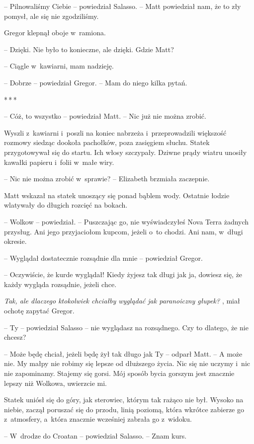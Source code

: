 \documentclass[oneside,polish,12pt,sfheadings]{mwbk}
\newcommand{\threeast}{\bigskip\par\centerline{*\,*\,*}\medskip\par}%
\begin{document}
-- Pilnowaliśmy Ciebie -- powiedział Salasso. -- Matt powiedział nam, że to
zły pomysł, ale się nie zgodziliśmy.

Gregor klepnął oboje w~ramiona. 

-- Dzięki. Nie było to konieczne, ale
dzięki. Gdzie Matt?

-- Ciągle w~kawiarni, mam nadzieję.

-- Dobrze -- powiedział Gregor. -- Mam do niego kilka pytań.

\threeast

-- Cóż, to wszystko -- powiedział Matt. -- Nic już nie można zrobić.

Wyszli z~kawiarni i~poszli na koniec nabrzeża i~przeprowadzili większość
rozmowy siedząc dookoła pachołków, poza zasięgiem słuchu. Statek
przygotowywał się do startu. Ich włosy szczypały. Dziwne prądy wiatru
unosiły kawałki papieru i~folii w~małe wiry.

-- Nic nie można zrobić w~sprawie? -- Elizabeth brzmiała zaczepnie.

Matt wskazał na statek unoszący się ponad bąblem wody. Ostatnie łodzie
wlatywały do długich rozcięć na bokach.

-- Wolkow -- powiedział. -- Puszczając go, nie wyświadczyłeś Nova Terra
żadnych przysług. Ani jego przyjaciołom kupcom, jeżeli o~to chodzi. Ani
nam, w~długi okresie.

-- Wyglądał dostatecznie rozsądnie dla mnie -- powiedział Gregor.

-- Oczywiście, że kurde wyglądał! Kiedy żyjesz tak długi jak ja, dowiesz
się, że każdy wygląda rozsądnie, jeżeli chce.

\emph{ Tak, ale dlaczego ktokolwiek chciałby wyglądać jak paranoiczny
głupek? }, miał ochotę zapytać Gregor.

-- Ty -- powiedział Salasso -- nie wyglądasz na rozsądnego. Czy to dlatego,
że nie chcesz?

-- Może będę chciał, jeżeli będę żył tak długo jak Ty -- odparł Matt. -- A
może nie. My małpy nie robimy się lepsze od dłuższego życia. Nic się nie
uczymy i~nic nie zapominamy. Stajemy się gorsi. Mój sposób bycia gorszym
jest znacznie lepszy niż Wolkowa, uwierzcie mi.

Statek uniósł się do góry, jak sterowiec, którym tak rażąco nie był.
Wysoko na niebie, zaczął poruszać się do przodu, linią poziomą, która
wkrótce zabierze go z~atmosfery, a~która znacznie wcześniej zabrała go z~widoku.

-- W~drodze do Croatan -- powiedział Salasso. -- Znam kurs.
\end{document}
